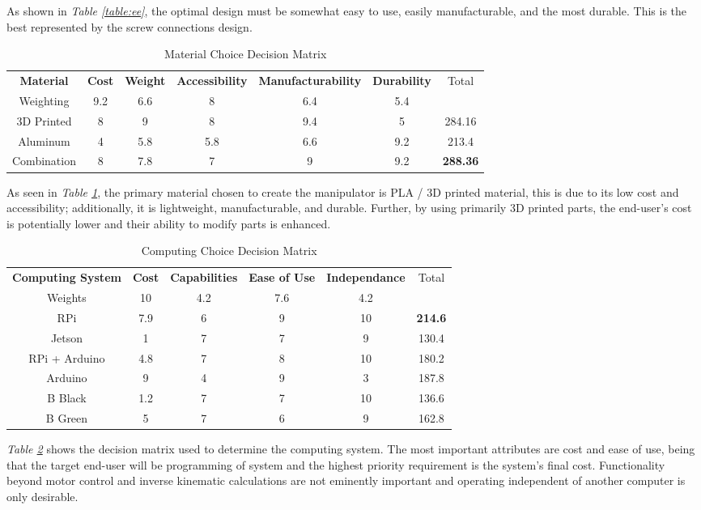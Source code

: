 \documentclass[12pt]{report}
\begin{document}
As shown in \emph{Table \ref{table:ee}}, the optimal design must be somewhat easy to use, easily manufacturable, and the most durable. This is the best represented by the screw connections design.

\begin{table}[htp]
  \center
  \caption{Material Choice Decision Matrix}
  \label{table:mat}
\small\begin{tabular}{c|cccccc}
\textbf{Material} & \textbf{Cost} & \textbf{Weight} & \textbf{Accessibility} & \textbf{Manufacturability} & \textbf{Durability} & Total \\\normalsize
Weighting & 9.2 & 6.6 & 8 & 6.4 & 5.4 & \\\hline
3D Printed & 8 & 9 & 8 & 9.4 & 5 & 284.16 \\
Aluminum & 4 & 5.8 & 5.8 & 6.6 & 9.2 & 213.4 \\
Combination & 8 & 7.8 & 7 & 9 & 9.2 & \textbf{288.36} \\
\end{tabular}
\end{table}
As seen in \emph{Table \ref{table:mat}}, the primary material chosen to create the manipulator is PLA / 3D printed material, this is due to its low cost and accessibility; additionally, it is lightweight, manufacturable, and durable. Further, by using primarily 3D printed parts, the end-user’s cost is potentially lower and their ability to modify parts is enhanced.
\newpage
\begin{table}[htp]
  \center
  \caption{Computing Choice Decision Matrix}
  \label{table:comp}
\begin{tabular}{c|ccccc}
\textbf{Computing System} & \textbf{Cost} & \textbf{Capabilities} & \textbf{Ease of Use} & \textbf{Independance} & Total \\
Weights & 10 & 4.2 & 7.6 & 4.2 & \\ \hline
RPi & 7.9 & 6 & 9 & 10 & \textbf{214.6} \\
Jetson & 1 & 7 & 7 & 9 & 130.4 \\
RPi + Arduino & 4.8 & 7 & 8 & 10 & 180.2 \\
Arduino & 9 & 4 & 9 & 3 & 187.8 \\
B Black & 1.2 & 7 & 7 & 10 & 136.6 \\
B Green & 5 & 7 & 6 & 9 & 162.8 \\
\end{tabular}
\end{table}

\emph{Table \ref{table:comp}} shows the decision matrix used to determine the computing system. The most important attributes are cost and ease of use, being that the target end-user will be programming of system and the highest priority requirement is the system's final cost. Functionality beyond motor control and inverse kinematic calculations are not eminently important and operating independent of another computer is only desirable.
\end{document}
